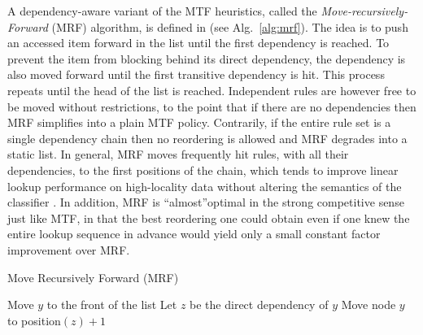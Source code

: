       
      

A dependency-aware variant of the MTF heuristics, called the \emph{Move-recursively-Forward} (MRF) algorithm, is defined in \cite{10228937} (see Alg.~\ref{alg:mrf}). The idea is to push an accessed item forward in the list until the first dependency is reached. To prevent the item from blocking behind its direct dependency, the dependency is also moved forward until the first transitive dependency is hit. This process repeats until the head of the list is reached.  Independent rules are however free to be moved without restrictions, to the point that if there are no dependencies then MRF simplifies into a plain MTF policy.  Contrarily, if the entire rule set is a single dependency chain then no reordering is allowed and MRF degrades into a static list. In general, MRF moves frequently hit rules, with all their dependencies, to the first positions of the chain, which tends to improve linear lookup performance on high-locality data without altering the semantics of the classifier \cite{10228937}. In addition, MRF is ``almost''optimal in the strong competitive sense just like MTF, in that the best reordering one could obtain even if one knew the entire lookup sequence in advance would yield only a small constant factor improvement over MRF.

\begin{algorithm}[t]
  \caption{Move Recursively Forward (MRF)}
  \label{alg:mrf}
  \begin{small}
    \begin{algorithmic}[1]
      \State Move $y$ to the front of the list
      \Else
      \State Let $z$ be the direct dependency of $y$
      \State Move node $y$ to position$(z) + 1$
      \State {}
      \EndIf
      \EndProcedure
    \end{algorithmic}
  \end{small}
\end{algorithm}

